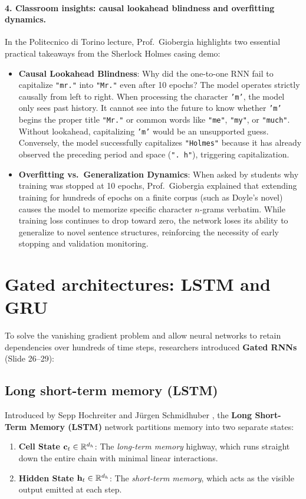 \documentclass[../../main.tex]{subfiles}
\begin{document}
\paragraph{4. Classroom insights: causal lookahead blindness and overfitting dynamics.}
In the Politecnico di Torino lecture, Prof.~Giobergia highlights two essential practical takeaways from the Sherlock Holmes casing demo:
\begin{itemize}
    \item \textbf{Causal Lookahead Blindness}: Why did the one-to-one RNN fail to capitalize \texttt{"mr."} into \texttt{"Mr."} even after 10 epochs? The model operates strictly causally from left to right. When processing the character \texttt{'m'}, the model only sees past history. It cannot see into the future to know whether \texttt{'m'} begins the proper title \texttt{"Mr."} or common words like \texttt{"me"}, \texttt{"my"}, or \texttt{"much"}. Without lookahead, capitalizing \texttt{'m'} would be an unsupported guess. Conversely, the model successfully capitalizes \texttt{"Holmes"} because it has already observed the preceding period and space (\texttt{". h"}), triggering capitalization.
    \item \textbf{Overfitting vs.~Generalization Dynamics}: When asked by students why training was stopped at 10 epochs, Prof.~Giobergia explained that extending training for hundreds of epochs on a finite corpus (such as Doyle's novel) causes the model to memorize specific character $n$-grams verbatim. While training loss continues to drop toward zero, the network loses its ability to generalize to novel sentence structures, reinforcing the necessity of early stopping and validation monitoring.
\end{itemize}

\section{Gated architectures: LSTM and GRU}
\label{sec:gated_architectures}

To solve the vanishing gradient problem and allow neural networks to retain dependencies over hundreds of time steps, researchers introduced \textbf{Gated RNNs} (Slide 26--29):

\subsection{Long short-term memory (LSTM)}
Introduced by Sepp Hochreiter and J{\"u}rgen Schmidhuber \cite{hochreiter1997}, the \textbf{Long Short-Term Memory (LSTM)} network partitions memory into two separate states:
\begin{enumerate}
    \item \textbf{Cell State $\mathbf{c}_t \in \mathbb{R}^{d_h}$}: The \emph{long-term memory} highway, which runs straight down the entire chain with minimal linear interactions.
    \item \textbf{Hidden State $\mathbf{h}_t \in \mathbb{R}^{d_h}$}: The \emph{short-term memory}, which acts as the visible output emitted at each step.
\end{enumerate}
\end{document}
